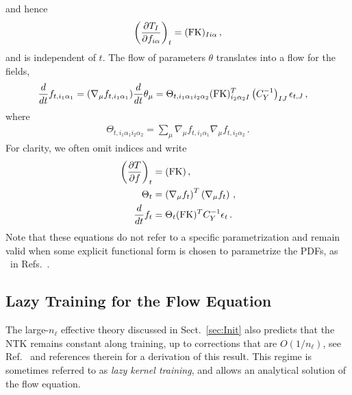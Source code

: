 \documentclass[11pt]{article}
\begin{document}
and hence 
\begin{align}
    \label{eq:dTbydf}
    \left(\frac{\partial T_I}{\partial f_{i\alpha}}\right)_t = 
        (\mathrm{FK})_{Ii\alpha}\, ,
\end{align}
and is independent of $t$. The flow of parameters $\theta$ translates into a flow for the fields, 
\begin{align}
    \label{eq:NTKFlow}
    \frac{d}{dt} &f_{t,i_1\alpha_1} = (\nabla_\mu f_{t,i_1\alpha_1}) \frac{d}{dt} \theta_\mu = 
      \Theta_{t,i_1\alpha_1i_2\alpha_2} 
      (\mathrm{FK})^T_{i_2\alpha_2I} \left(C_Y^{-1}\right)_{IJ} \epsilon_{t,J}\, ,    
\end{align}
where
\begin{align}
    \label{eq:NTKDef}
    \Theta_{t,i_1\alpha_1i_2\alpha_2} = \sum_\mu 
    \nabla_\mu f_{t,i_1\alpha_1} \nabla_\mu f_{t,i_2\alpha_2}\, .
\end{align}
For clarity, we often omit indices and write
\begin{align}
    \left(\frac{\partial T}{\partial f}\right)_t 
        &= (\mathrm{FK})\, , \\
    \Theta_t  
        &= \left(\nabla_\mu f_t\right)^T \left(\nabla_\mu f_t\right)\, , \\
    \label{eq:FlowEquationNoIndices}
    \frac{d}{dt} f_t 
        &= \Theta_t (\mathrm{FK})^T C_Y^{-1} \epsilon_t\, .
\end{align}
Note that these equations do not refer to a specific parametrization and remain valid when some 
explicit functional form is chosen to parametrize the PDFs, as \eg\ in 
Refs.~\cite{Bailey:2020ooq,Hou:2019efy}.

\subsection{Lazy Training for the Flow Equation}
\label{sec:Lazy}

The large-$n_{\ell}$ effective theory discussed in Sect.~\ref{sec:Init} also predicts that
the NTK remains constant along training, up to corrections that are $O(1/n_{\ell})$, see 
Ref.~\cite{DBLP:journals/corr/abs-1806-07572} and references therein for a derivation of this result. 
This regime is sometimes referred to as {\em lazy kernel training}, and allows an analytical
solution of the flow equation.
\end{document}
